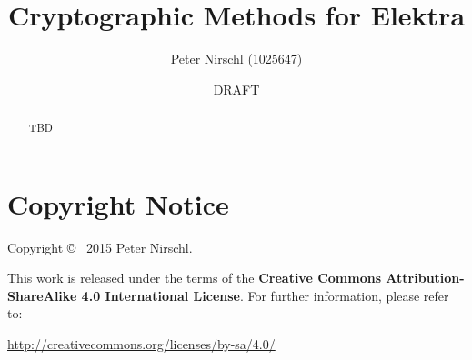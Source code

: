 \documentclass[a4paper,12pt]{report}
\title{Cryptographic Methods for Elektra}
\author{Peter Nirschl (1025647)}
\date{DRAFT}
\begin{document}
\maketitle
\begin{abstract}
TBD
\end{abstract}

\newpage
\section*{Copyright Notice}

Copyright \copyright~ 2015 Peter Nirschl.

This work is released under the terms of the \textbf{Creative Commons Attribution-ShareAlike 4.0 International License}.
For further information, please refer to:

\url{http://creativecommons.org/licenses/by-sa/4.0/}
\newpage

\setcounter{tocdepth}{3} %
\tableofcontents
\newpage





\end{document}
